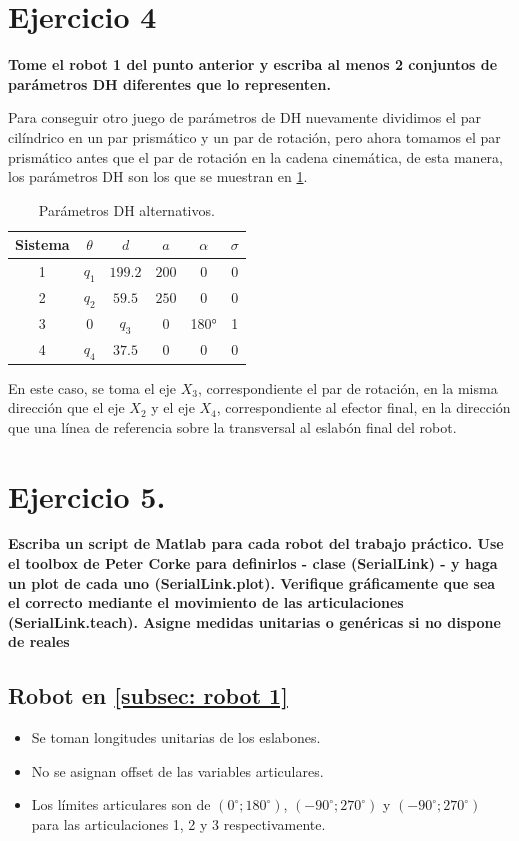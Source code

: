 \documentclass[a4paper,12pt]{article}
\begin{document}
\section{Ejercicio 4}
\textbf{Tome el robot 1 del punto anterior y escriba al menos 2 conjuntos de parámetros
DH diferentes que lo representen.}

Para conseguir otro juego de parámetros de DH nuevamente dividimos
el par cilíndrico en un par prismático y un par de rotación, pero ahora
tomamos el par prismático antes que el par de rotación en la cadena cinemática,
de esta manera, los parámetros DH son los que se muestran en \cref{parametros DH2}.

\begin{table}[H]
    \centering
    \begin{tabular}{|c|c|c|c|c|c|}
    \hline
    Sistema & $\theta$  & $d$           & $a$    & $\alpha$ & $\sigma$ \\ \hline
    1       & $q_1$     & $199.2$       & $200$  & 0        & 0        \\ \hline
    2       & $q_2$     & $59.5$        & $250$  & 0        & 0        \\ \hline
    3       & $0$       & $q_3$         & $0$    & 180°     & 1        \\ \hline
    4       & $q_4$     & $37.5$        & $0$    & 0        & 0        \\ \hline
    \end{tabular}
    \caption{Parámetros DH alternativos.}
    \label{parametros DH2}
\end{table}
En este caso, se toma el eje $X_3$, correspondiente el par de rotación,
en la misma dirección que el eje $X_2$ y el eje $X_4$, correspondiente al efector final,
en la dirección que una línea de referencia sobre la transversal al eslabón final del robot.

\section{Ejercicio 5.}
\textbf{Escriba un script de Matlab para cada robot del trabajo práctico. Use el toolbox de
Peter Corke para definirlos - clase (SerialLink) - y haga un plot de cada uno (SerialLink.plot).
Verifique gráficamente que sea el correcto mediante el movimiento de las articulaciones
(SerialLink.teach). Asigne medidas unitarias o genéricas si no dispone de 
reales}


\subsection{Robot en \cref{subsec: robot 1}}
\begin{itemize}
    \item Se toman longitudes unitarias de los eslabones.
    \item No se asignan offset de las variables articulares.
    \item Los límites articulares son de $\left(0^\circ; 180^\circ\right)$, $\left(-90^\circ; 270^\circ\right)$ y $\left(-90^\circ; 270^\circ\right)$ para las articulaciones 1, 2 y 3 respectivamente.
\end{itemize}
\end{document}
